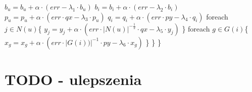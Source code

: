 \documentclass{pracamgr}
\begin{document}
    \hspace*{48pt}			$b_u=b_u+\alpha\cdot(err-\lambda_1\cdot b_u)$\newline
    \hspace*{48pt}			$b_i=b_i+\alpha\cdot(err-\lambda_2\cdot b_i)$\newline
    \hspace*{48pt}			$p_u=p_u+\alpha\cdot(err\cdot qx-\lambda_3\cdot p_u)$\newline
    \hspace*{48pt}			$q_i=q_i+\alpha\cdot(err\cdot py-\lambda_4\cdot q_i)$\newline
    \hspace*{48pt}			foreach $j\in N(u)$\{\newline
    \hspace*{64pt}				$y_j=y_j+\alpha\cdot(err\cdot |N(u)|^{-\frac{1}{2}}\cdot qx-\lambda_5\cdot y_j)$\newline
    \hspace*{48pt}			\}\newline
    \hspace*{48pt}			foreach $g\in G(i)$\{\newline
    \hspace*{64pt}				$x_g=x_g+\alpha\cdot(err\cdot |G(i))|^{-1}\cdot py-\lambda_6\cdot x_g)$\newline
    \hspace*{48pt}			\}\newline
    \hspace*{32pt}		\}\newline
    \hspace*{16pt}	\}\newline
 \chapter{TODO - ulepszenia}
  
\end{document}
